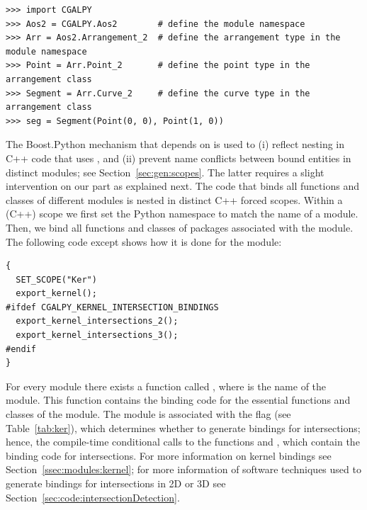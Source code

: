 \begin{lstlisting}[style=pythonStyle]
>>> import CGALPY
>>> Aos2 = CGALPY.Aos2        # define the module namespace
>>> Arr = Aos2.Arrangement_2  # define the arrangement type in the module namespace
>>> Point = Arr.Point_2       # define the point type in the arrangement class
>>> Segment = Arr.Curve_2     # define the curve type in the arrangement class
>>> seg = Segment(Point(0, 0), Point(1, 0))
\end{lstlisting}

The Boost.Python mechanism that depends on  is used to (i) reflect nesting in C++ code that uses \cgal, and (ii) prevent name conflicts between bound entities in distinct modules; see Section~\ref{sec:gen:scopes}. The latter requires a slight intervention on our part as explained next. The code that binds all functions and classes of different modules is nested in distinct C++ forced scopes. Within a (C++) scope we first set the Python namespace to match the name of a module. Then, we bind all functions and classes of \cgal{} packages associated with the module. The following code except shows how it is done for the \iiDandiiiDGeometryKernelPackage{}
module:

\begin{lstlisting}[style=cppNumberedStyle]
{
  SET_SCOPE("Ker")
  export_kernel();
#ifdef CGALPY_KERNEL_INTERSECTION_BINDINGS
  export_kernel_intersections_2();
  export_kernel_intersections_3();
#endif
}
\end{lstlisting}

For every module there exists a function called ,
where  is the name of the module. This function contains the binding 
code for the essential functions and classes of the module. The \iiDandiiiDGeometryKernelPackage{} module is associated with the \cmake{}  flag (see Table~\ref{tab:ker}), 
which determines whether to generate bindings for intersections; hence, the compile-time conditional calls to the functions
 and
, which contain the binding code 
for intersections. For more information on kernel bindings see
Section~\ref{ssec:modules:kernel}; for more information of software techniques 
used to generate bindings for intersections in 2D or 3D see Section~\ref{sec:code:intersectionDetection}.

